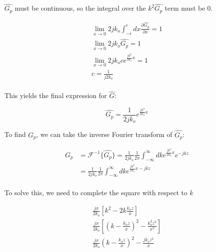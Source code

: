 \noindent $\hat{G_p}$ must be continuous, so the integral over the $k^2\hat{G_p}$ term must be 0.

\begin{equation}
\begin{gathered}
\lim_{x\rightarrow 0}2jk_o\int_{-\epsilon}^{\epsilon}dx\frac{\partial\hat{G_p}}{\partial x}= 1\\
\lim_{x\rightarrow 0}2jk_o\hat{G_p} = 1 \\
\lim_{x\rightarrow 0}2jk_oce^{\frac{jk^2}{2k_o}x} = 1\\
c = \frac{1}{j2k_o}\\
\end{gathered}
\label{gf_eq:11cb}
\end{equation}
 \renewcommand{\baselinestretch}{2} \small\normalsize
 
\noindent This yields the final expression for $\hat{G}$:

\begin{equation}
\boxed{\hat{G_p}= \frac{1}{2jk_o}e^{\frac{jk^2}{2k_o}x}}
\label{gf_eq:11cc}
\end{equation}
 \renewcommand{\baselinestretch}{2} \small\normalsize
 
\noindent To find $G_p$, we can take the inverse Fourier transform of $\hat{G_p}$:

\begin{equation}
\begin{aligned}
G_p &= \mathcal{F}^{-1}\{\hat{G_p}\} = \frac{1}{2jk_o}\frac{1}{2\pi}\int_{-\infty}^{\infty}dk e^{\frac{jk^2}{2k_o}x}e^{-jkz} \\
& = \frac{1}{2jk_o}\frac{1}{2\pi}\int_{-\infty}^{\infty}dk e^{\frac{jk^2}{2k_o}x-jkz} \\
\end{aligned}
\label{gf_eq:11d}
\end{equation}
 \renewcommand{\baselinestretch}{2} \small\normalsize
 
\noindent To solve this, we need to complete the square with respect to $k$

\begin{equation}
\begin{gathered}
\frac{jx}{2k_o}\left[k^2  -2k\frac{k_oz}{x}\right]\\
\frac{jx}{2k_o}\left[\left(k - \frac{k_oz}{x}\right)^2 - \frac{k_o^2z^2}{x^2} \right]\\
\frac{jx}{2k_o}\left(k - \frac{k_oz}{x}\right)^2 - \frac{jk_oz^2}{x}\\
\end{gathered}
\label{gf_eq:11e}
\end{equation}
 \renewcommand{\baselinestretch}{2} \small\normalsize
 
